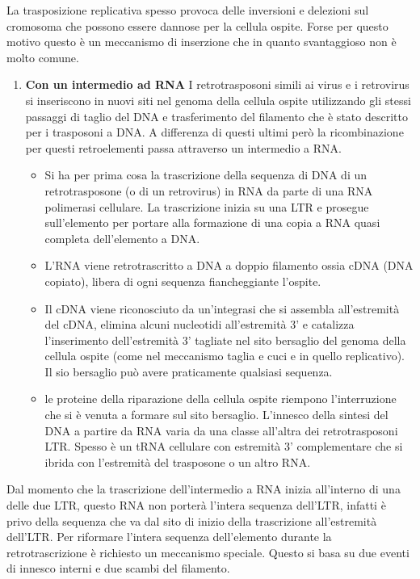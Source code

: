 \documentclass[]{article}
\begin{document}
La trasposizione replicativa spesso provoca delle inversioni e delezioni
sul cromosoma che possono essere dannose per la cellula ospite. Forse
per questo motivo questo è un meccanismo di inserzione che in quanto
svantaggioso non è molto comune.

\begin{enumerate}
\def\labelenumi{\arabic{enumi}.}
\setcounter{enumi}{2}
\itemsep1pt\parskip0pt
\item
  \textbf{Con un intermedio ad RNA} I retrotrasposoni simili ai virus e
  i retrovirus si inseriscono in nuovi siti nel genoma della cellula
  ospite utilizzando gli stessi passaggi di taglio del DNA e
  trasferimento del filamento che è stato descritto per i trasposoni a
  DNA. A differenza di questi ultimi però la ricombinazione per questi
  retroelementi passa attraverso un intermedio a RNA.

  \begin{itemize}
  \itemsep1pt\parskip0pt
  \item
    Si ha per prima cosa la trascrizione della sequenza di DNA di un
    retrotrasposone (o di un retrovirus) in RNA da parte di una RNA
    polimerasi cellulare. La trascrizione inizia su una LTR e prosegue
    sull'elemento per portare alla formazione di una copia a RNA quasi
    completa dell'elemento a DNA.
  \item
    L'RNA viene retrotrascritto a DNA a doppio filamento ossia cDNA (DNA
    copiato), libera di ogni sequenza fiancheggiante l'ospite.
  \item
    Il cDNA viene riconosciuto da un'integrasi che si assembla
    all'estremità del cDNA, elimina alcuni nucleotidi all'estremità 3' e
    catalizza l'inserimento dell'estremità 3' tagliate nel sito
    bersaglio del genoma della cellula ospite (come nel meccanismo
    taglia e cuci e in quello replicativo). Il sio bersaglio può avere
    praticamente qualsiasi sequenza.
  \item
    le proteine della riparazione della cellula ospite riempono
    l'interruzione che si è venuta a formare sul sito bersaglio.
    L'innesco della sintesi del DNA a partire da RNA varia da una classe
    all'altra dei retrotrasposoni LTR. Spesso è un tRNA cellulare con
    estremità 3' complementare che si ibrida con l'estremità del
    trasposone o un altro RNA.
  \end{itemize}
\end{enumerate}

Dal momento che la trascrizione dell'intermedio a RNA inizia all'interno
di una delle due LTR, questo RNA non porterà l'intera sequenza dell'LTR,
infatti è privo della sequenza che va dal sito di inizio della
trascrizione all'estremità dell'LTR. Per riformare l'intera sequenza
dell'elemento durante la retrotrascrizione è richiesto un meccanismo
speciale. Questo si basa su due eventi di innesco interni e due scambi
del filamento.
\end{document}
